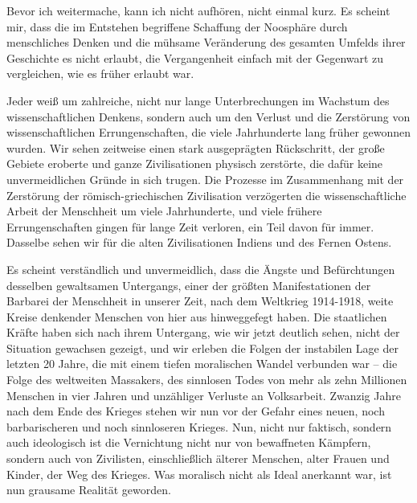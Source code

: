 \documentclass[11pt,a4paper]{book}
\begin{document}
Bevor ich weitermache, kann ich nicht aufhören, nicht einmal kurz. Es scheint mir, dass die im Entstehen begriffene Schaffung der Noosphäre durch menschliches Denken und die mühsame Veränderung des gesamten Umfelds ihrer Geschichte es nicht erlaubt, die Vergangenheit einfach mit der Gegenwart zu vergleichen, wie es früher erlaubt war. 

Jeder weiß um zahlreiche, nicht nur lange Unterbrechungen im Wachstum des wissenschaftlichen Denkens, sondern auch um den Verlust und die Zerstörung von wissenschaftlichen Errungenschaften, die viele Jahrhunderte lang früher gewonnen wurden. Wir sehen zeitweise einen stark ausgeprägten Rückschritt, der große Gebiete eroberte und ganze Zivilisationen physisch zerstörte, die dafür keine unvermeidlichen Gründe in sich trugen. Die Prozesse im Zusammenhang mit der Zerstörung der römisch-griechischen Zivilisation verzögerten die wissenschaftliche Arbeit der Menschheit um viele Jahrhunderte, und viele frühere Errungenschaften gingen für lange Zeit verloren, ein Teil davon für immer. Dasselbe sehen wir für die alten Zivilisationen Indiens und des Fernen Ostens. 

Es scheint verständlich und unvermeidlich, dass die Ängste und Befürchtungen desselben gewaltsamen Untergangs, einer der größten Manifestationen der Barbarei der Menschheit in unserer Zeit, nach dem Weltkrieg 1914-1918, weite Kreise denkender Menschen von hier aus hinweggefegt haben. Die staatlichen Kräfte haben sich nach ihrem Untergang, wie wir jetzt deutlich sehen, nicht der Situation gewachsen gezeigt, und wir erleben die Folgen der instabilen Lage der letzten 20 Jahre, die mit einem tiefen moralischen Wandel verbunden war -- die Folge des weltweiten Massakers, des sinnlosen Todes von mehr als zehn Millionen Menschen in vier Jahren und unzähliger Verluste an Volksarbeit. Zwanzig Jahre nach dem Ende des Krieges stehen wir nun vor der Gefahr eines neuen, noch barbarischeren und noch sinnloseren Krieges. Nun, nicht nur faktisch, sondern auch ideologisch ist die Vernichtung nicht nur von bewaffneten Kämpfern, sondern auch von Zivilisten, einschließlich älterer Menschen, alter Frauen und Kinder, der Weg des Krieges. Was moralisch nicht als Ideal anerkannt war, ist nun grausame Realität geworden. 
\end{document}
